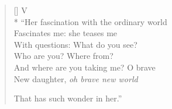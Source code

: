 \begin{verse}[\versewidth]
V\\*
``Her fascination with the ordinary world\\
Fascinates me: she teases me\\
With questions: What do you see?\\
Who are you? Where from?\\
And where are you taking me? O brave\\
New daughter, \textit{oh brave new world}

That has such wonder in her.''
\end{verse}
